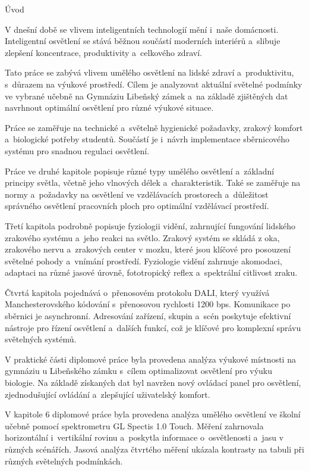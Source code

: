 \chap Úvod

V dnešní době se vlivem inteligentních technologií mění i~naše domácnosti.
Inteligentní osvětlení se stává běžnou součástí moderních interiérů a~slibuje
zlepšení koncentrace, produktivity a~celkového zdraví.

Tato práce se zabývá vlivem umělého osvětlení na lidské zdraví a~produktivitu,
s~důrazem na výukové prostředí.
Cílem je analyzovat aktuální světelné podmínky ve vybrané učebně
na Gymnáziu Libeňský zámek a~na základě zjištěných dat navrhnout
optimální osvětlení pro různé výukové situace.

Práce se zaměřuje na technické a~světelně hygienické požadavky,
zrakový komfort a~biologické potřeby studentů.
Součástí je i~návrh implementace sběrnicového systému
pro snadnou regulaci osvětlení.

Práce ve druhé kapitole popisuje různé typy umělého
osvětlení a~základní principy světla, včetně jeho vlnových délek a~charakteristik.
Také se zaměřuje na normy a~požadavky na osvětlení ve vzdělávacích
prostorech a~důležitost správného osvětlení pracovních ploch pro optimální vzdělávací prostředí.

Třetí kapitola podrobně popisuje fyziologii vidění, zahrnující
fungování lidského zrakového systému a~jeho reakci na světlo.
Zrakový systém se skládá z oka, zrakového nervu a~zrakových center v mozku,
které jsou klíčové pro posouzení světelné pohody a~vnímání prostředí.
Fyziologie vidění zahrnuje akomodaci, adaptaci na různé jasové úrovně,
fototropický reflex a~spektrální citlivost zraku.

Čtvrtá kapitola pojednává o~přenosovém protokolu DALI, který
využívá Manchesterovského kódování s~přenosovou rychlosti 1200 bps.
Komunikace po sběrnici je asynchronní.
Adresování zařízení, skupin a~scén poskytuje efektivní nástroje pro řízení
osvětlení a~dalších funkcí, což je klíčové pro komplexní správu světelných systémů.

V praktické části diplomové práce byla provedena analýza výukové místnosti na
gymnáziu u Libeňského zámku s~cílem optimalizovat osvětlení pro výuku biologie.
Na základě získaných dat byl navržen nový ovládací panel pro osvětlení,
zjednodušující ovládání a~zlepšující uživatelský komfort.

V kapitole 6 diplomové práce byla provedena analýza umělého osvětlení ve školní učebně
pomocí spektrometru GL Spectis 1.0 Touch.
Měření zahrnovala horizontální i~vertikální rovinu a~poskytla
informace o~osvětlenosti a~jasu v různých scénářích.
Jasová analýza čtvrtého měření ukázala kontrasty na tabuli při různých světelných podmínkách.

